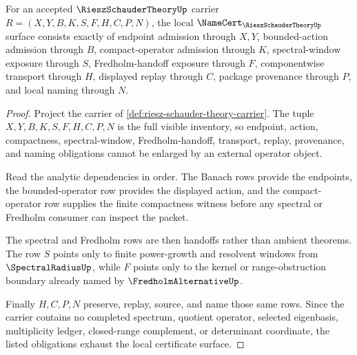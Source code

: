 \begin{theorem}
\label{thm:riesz-schauder-theory-namecert-obligations}
For an accepted $\RieszSchauderTheoryUp$ carrier $R=(X,Y,B,K,S,F,H,C,P,N)$, the local $\NameCert_{\RieszSchauderTheoryUp}$ surface consists exactly of endpoint admission through $X,Y$, bounded-action admission through $B$, compact-operator admission through $K$, spectral-window exposure through $S$, Fredholm-handoff exposure through $F$, componentwise transport through $H$, displayed replay through $C$, package provenance through $P$, and local naming through $N$.
\end{theorem}
\begin{proof}
Project the carrier of \autoref{def:riesz-schauder-theory-carrier}. The tuple $X,Y,B,K,S,F,H,C,P,N$ is the full visible inventory, so endpoint, action, compactness, spectral-window, Fredholm-handoff, transport, replay, provenance, and naming obligations cannot be enlarged by an external operator object.

Read the analytic dependencies in order. The Banach rows provide the endpoints, the bounded-operator row provides the displayed action, and the compact-operator row supplies the finite compactness witness before any spectral or Fredholm consumer can inspect the packet.

The spectral and Fredholm rows are then handoffs rather than ambient theorems. The row $S$ points only to finite power-growth and resolvent windows from $\SpectralRadiusUp$, while $F$ points only to the kernel or range-obstruction boundary already named by $\FredholmAlternativeUp$.

Finally $H,C,P,N$ preserve, replay, source, and name those same rows. Since the carrier contains no completed spectrum, quotient operator, selected eigenbasis, multiplicity ledger, closed-range complement, or determinant coordinate, the listed obligations exhaust the local certificate surface.
\end{proof}

